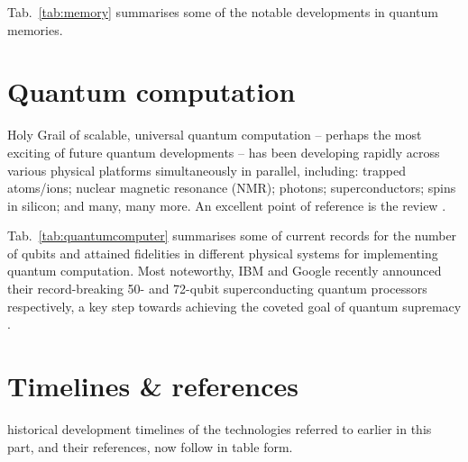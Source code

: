 Tab.~\ref{tab:memory} summarises some of the notable developments in quantum memories.

%
%

\section{Quantum computation}

 Holy Grail of scalable, universal quantum computation -- perhaps the most exciting of future quantum developments -- has been developing rapidly across various physical platforms simultaneously in parallel, including: trapped atoms/ions; nuclear magnetic resonance (NMR); photons; superconductors; spins in silicon; and many, many more. An excellent point of reference is the review \cite{bib:ladd2010quantum}.

Tab.~\ref{tab:quantumcomputer} summarises some of current records for the number of qubits and attained fidelities in different physical systems for implementing quantum computation. Most noteworthy, IBM and Google recently announced their record-breaking 50- and 72-qubit superconducting quantum processors respectively, a key step towards achieving the coveted goal of quantum supremacy \cite{bib:savage2018quantum, bib:neill2018blueprint, bib:harrow2017quantum}.


%
%

\section{Timelines \& references}\label{sec:timeline_tables}

 historical development timelines of the technologies referred to earlier in this part, and their references, now follow in table form.

